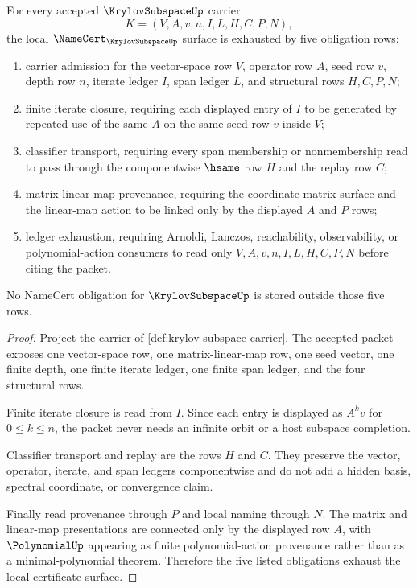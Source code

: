 \begin{theorem}
\label{thm:krylov-subspace-namecert-boundary}
For every accepted $\KrylovSubspaceUp$ carrier
$$
K=(V,A,v,n,I,L,H,C,P,N),
$$
the local $\NameCert_{\KrylovSubspaceUp}$ surface is exhausted by five obligation rows:
\begin{enumerate}
\item carrier admission for the vector-space row $V$, operator row $A$, seed row $v$, depth row $n$, iterate ledger $I$, span ledger $L$, and structural rows $H,C,P,N$;
\item finite iterate closure, requiring each displayed entry of $I$ to be generated by repeated use of the same $A$ on the same seed row $v$ inside $V$;
\item classifier transport, requiring every span membership or nonmembership read to pass through the componentwise $\hsame$ row $H$ and the replay row $C$;
\item matrix-linear-map provenance, requiring the coordinate matrix surface and the linear-map action to be linked only by the displayed $A$ and $P$ rows;
\item ledger exhaustion, requiring Arnoldi, Lanczos, reachability, observability, or polynomial-action consumers to read only $V,A,v,n,I,L,H,C,P,N$ before citing the packet.
\end{enumerate}
No NameCert obligation for $\KrylovSubspaceUp$ is stored outside those five rows.
\end{theorem}
\begin{proof}
Project the carrier of \autoref{def:krylov-subspace-carrier}. The accepted packet exposes one vector-space row, one matrix-linear-map row, one seed vector, one finite depth, one finite iterate ledger, one finite span ledger, and the four structural rows.

Finite iterate closure is read from $I$. Since each entry is displayed as $A^k v$ for $0\leq k\leq n$, the packet never needs an infinite orbit or a host subspace completion.

Classifier transport and replay are the rows $H$ and $C$. They preserve the vector, operator, iterate, and span ledgers componentwise and do not add a hidden basis, spectral coordinate, or convergence claim.

Finally read provenance through $P$ and local naming through $N$. The matrix and linear-map presentations are connected only by the displayed row $A$, with $\PolynomialUp$ appearing as finite polynomial-action provenance rather than as a minimal-polynomial theorem. Therefore the five listed obligations exhaust the local certificate surface.
\end{proof}

